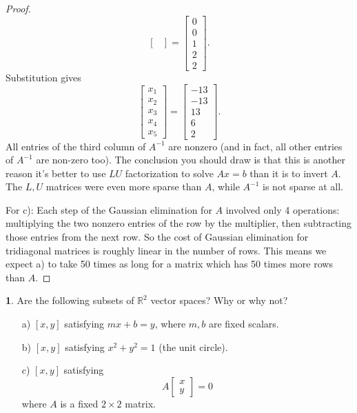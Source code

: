 \documentclass{article}
\theoremstyle{definition}
\newtheorem{prob}{}
\begin{document}
\begin{proof}
\[\begin{bmatrix}
\end{bmatrix}= \begin{bmatrix}
0\\0\\1\\ 2\\2
\end{bmatrix}.\]
Substitution gives 
\[\begin{bmatrix}
	x_1\\x_2\\x_3\\x_4\\x_5
\end{bmatrix}= \begin{bmatrix}
-13\\-13\\13	\\6\\2
\end{bmatrix}.\]
All entries of the third column of $A^{-1}$ are nonzero (and in fact, all other entries of $A^{-1}$ are non-zero too). The conclusion you should draw is that this is another reason it's better to use $LU$ factorization to solve $Ax=b$ than it is to invert $A$. The $L, U$ matrices were even more sparse than $A$, while $A^{-1}$ is not sparse at all.

For c): Each step of the Gaussian elimination for $A$ involved only 4 operations: multiplying the two nonzero entries of the row by the multiplier, then subtracting those entries from the next row. So the cost of Gaussian elimination for tridiagonal matrices is roughly linear in the number of rows. This means we expect a) to take 50 times as long for a matrix which has 50 times more rows than $A$.
\end{proof}

\begin{prob} Are the following subsets of $\mathbb{R}^2$ vector spaces? Why or why not?
	\begin{itemize}
		\item [a)] $[x, y]$ satisfying $mx+b=y$, where $m, b$ are fixed scalars.
		\item [b)] $[x,y]$ satisfying $x^2 + y^2 =1$ (the unit circle).
		\item [c)] $[x, y]$ satisfying 
		\[A \begin{bmatrix}
			x \\y
		\end{bmatrix}=0\]
	where $A$ is a fixed $2 \times 2$ matrix.
	\end{itemize}
\end{prob}
\end{document}
